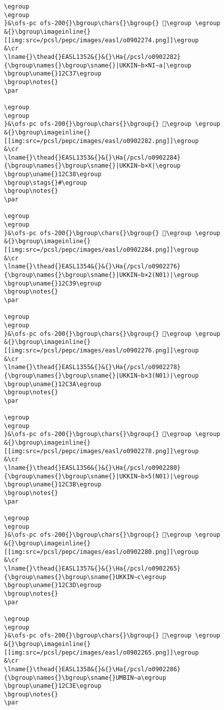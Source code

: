 \begin{verbatim}
\egroup
\egroup
}&\ofs-pc ofs-200{}\bgroup\chars{}\bgroup{} 𒰶\egroup \egroup
&{}\bgroup\imageinline{}[[img:src=/pcsl/pepc/images/easl/o0902274.png]]\egroup
&\cr
\lname{}\thead{}EASL1352&{}&{}\Ha{/pcsl/o0902282}{\bgroup\names{}\bgroup\sname{}|UKKIN∼b×NI∼a|\egroup
\bgroup\uname{}12C37\egroup
\bgroup\notes{}
\par 

\egroup
\egroup
}&\ofs-pc ofs-200{}\bgroup\chars{}\bgroup{} 𒰷\egroup \egroup
&{}\bgroup\imageinline{}[[img:src=/pcsl/pepc/images/easl/o0902282.png]]\egroup
&\cr
\lname{}\thead{}EASL1353&{}&{}\Ha{/pcsl/o0902284}{\bgroup\names{}\bgroup\sname{}|UKKIN∼b×X|\egroup
\bgroup\uname{}12C38\egroup
\bgroup\stags{}#\egroup
\bgroup\notes{}
\par 

\egroup
\egroup
}&\ofs-pc ofs-200{}\bgroup\chars{}\bgroup{} 𒰸\egroup \egroup
&{}\bgroup\imageinline{}[[img:src=/pcsl/pepc/images/easl/o0902284.png]]\egroup
&\cr
\lname{}\thead{}EASL1354&{}&{}\Ha{/pcsl/o0902276}{\bgroup\names{}\bgroup\sname{}|UKKIN∼b×2(N01)|\egroup
\bgroup\uname{}12C39\egroup
\bgroup\notes{}
\par 

\egroup
\egroup
}&\ofs-pc ofs-200{}\bgroup\chars{}\bgroup{} 𒰹\egroup \egroup
&{}\bgroup\imageinline{}[[img:src=/pcsl/pepc/images/easl/o0902276.png]]\egroup
&\cr
\lname{}\thead{}EASL1355&{}&{}\Ha{/pcsl/o0902278}{\bgroup\names{}\bgroup\sname{}|UKKIN∼b×3(N01)|\egroup
\bgroup\uname{}12C3A\egroup
\bgroup\notes{}
\par 

\egroup
\egroup
}&\ofs-pc ofs-200{}\bgroup\chars{}\bgroup{} 𒰺\egroup \egroup
&{}\bgroup\imageinline{}[[img:src=/pcsl/pepc/images/easl/o0902278.png]]\egroup
&\cr
\lname{}\thead{}EASL1356&{}&{}\Ha{/pcsl/o0902280}{\bgroup\names{}\bgroup\sname{}|UKKIN∼b×5(N01)|\egroup
\bgroup\uname{}12C3B\egroup
\bgroup\notes{}
\par 

\egroup
\egroup
}&\ofs-pc ofs-200{}\bgroup\chars{}\bgroup{} 𒰻\egroup \egroup
&{}\bgroup\imageinline{}[[img:src=/pcsl/pepc/images/easl/o0902280.png]]\egroup
&\cr
\lname{}\thead{}EASL1357&{}&{}\Ha{/pcsl/o0902265}{\bgroup\names{}\bgroup\sname{}UKKIN∼c\egroup
\bgroup\uname{}12C3D\egroup
\bgroup\notes{}
\par 

\egroup
\egroup
}&\ofs-pc ofs-200{}\bgroup\chars{}\bgroup{} 𒰽\egroup \egroup
&{}\bgroup\imageinline{}[[img:src=/pcsl/pepc/images/easl/o0902265.png]]\egroup
&\cr
\lname{}\thead{}EASL1358&{}&{}\Ha{/pcsl/o0902286}{\bgroup\names{}\bgroup\sname{}UMBIN∼a\egroup
\bgroup\uname{}12C3E\egroup
\bgroup\notes{}
\par 


\end{verbatim}

